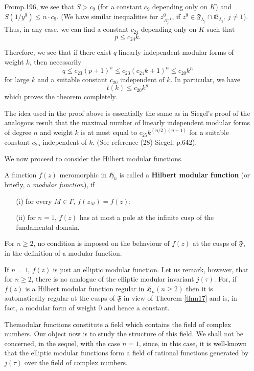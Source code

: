From\pageoriginale p.\@ 196, we see that $S>c_{9}$ (for a constant
$c_{9}$ depending only on $K$) and $S(1/y^{0})\leq n\cdot c_{9}$. (We
have similar inequalities for $z^{0}_{A^{-1}_{j}}$, if
$z^{0}\in\mathfrak{F}_{\lambda_{j}}\cap \mathfrak{G}_{\lambda_{j}}$,
$j\neq 1$). Thus, in any case, we can find a constant $c_{24}$
depending only on $K$ such that 
$$
p\leq c_{24}k.
$$

Therefore, we see that if there exist $q$ linearly independent modular
forms of weight $k$, then necessarily
$$
q\leq c_{23}(p+1)^{n}\leq c_{23}(c_{24}k+1)^{n}\leq c_{20}k^{n}
$$
for large $k$ and a suitable constant $c_{20}$ independent of $k$. In
particular, we have
$$
t(k)\leq c_{20}k^{n}
$$
which proves the theorem completely.

The idea used in the proof above is essentially the same as in
Siegel's proof of the analogous result that the maximal number of
linearly independent modular forms of degree $n$ and weight $k$ is at
most equal to $c_{25}k^{(n/2)(n+1)}$ for a suitable constant $c_{25}$
independent of $k$. (See reference (28) Siegel, p.\@ 642).

We now proceed to consider the Hilbert modular functions.

A function $f(z)$ meromorphic in $\mathfrak{H}_{n}$ is called a {\bf
  Hilbert modular function} (or briefly, a {\em modular function}), if
\begin{itemize}
\item[(i)] for every $M\in\Gamma$, $f(z_{M})=f(z)$;

\item[(ii)] for $n=1$, $f(z)$ has at most a pole at the infinite cusp
  of the fundamental domain.
\end{itemize}

For $n\geq 2$, no condition is imposed on the behaviour of $f(z)$ at
the cusps of $\mathfrak{F}$, in the definition of a modular function.

If $n=1$, $f(z)$ is just an elliptic modular function. Let us remark,
however, that for $n\geq 2$, there is no analogue of the elliptic
modular invariant $j(\tau)$. For, if $f(z)$ is a Hilbert modular
function regular in $\mathfrak{H}_{n}(n\geq 2)$ then it is
automatically regular at the cusps of $\mathfrak{F}$ in view of
Theorem \ref{thm17} and is, in fact, a modular form of weight $0$ and
hence a constant.


The\pageoriginale modular functions constitute a field which contains
the field of complex numbers. Our object now is to study the structure
of this field. We shall not be concerned, in the sequel, with the case
$n=1$, since, in this case, it is well-known that the elliptic modular
functions form a field of rational functions generated by $j(\tau)$
over the field of complex numbers.

